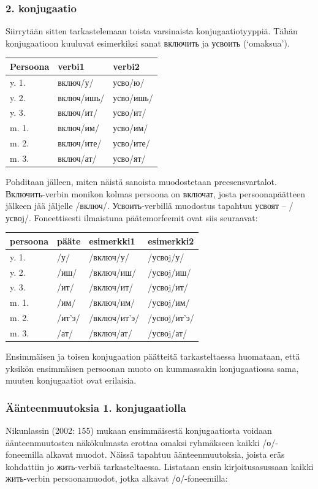 \documentclass[]{scrartcl}
\begin{document}
\subsubsection{2. konjugaatio}\label{konjugaatio-1}

Siirrytään sitten tarkastelemaan toista varsinaista konjugaatiotyyppiä.
Tähän konjugaatioon kuuluvat esimerkiksi sanat включить ja усвоить
(`omaksua').

\begin{longtable}[c]{@{}lll@{}}
\toprule
Persoona & verbi1 & verbi2\tabularnewline
\midrule
\endhead
y. 1. & включ/у/ & усво/ю/\tabularnewline
y. 2. & включ/ишь/ & усво/ишь/\tabularnewline
y. 3. & включ/ит/ & усво/ит/\tabularnewline
m. 1. & включ/им/ & усво/им/\tabularnewline
m. 2. & включ/ите/ & усво/ите/\tabularnewline
m. 3. & включ/ат/ & усво/ят/\tabularnewline
\bottomrule
\end{longtable}

Pohditaan jälleen, miten näistä sanoista muodostetaan preesensvartalot.
Включить-verbin monikon kolmas persoona on включат, josta
persoonapäätteen jälkeen jää jäljelle /включ/. Усвоить-verbillä
muodostus tapahtuu усвоят -- /усвоj/. Foneettisesti ilmaistuna
päätemorfeemit ovat siis seuraavat:

\begin{longtable}[c]{@{}llll@{}}
\toprule
persoona & pääte & esimerkki1 & esimerkki2\tabularnewline
\midrule
\endhead
y. 1. & /у/ & /включ/у/ & /усвоj/у/\tabularnewline
y. 2. & /иш/ & /включ/иш/ & /усвоj/иш/\tabularnewline
y. 3. & /ит/ & /включ/ит/ & /усвоj/ит/\tabularnewline
m. 1. & /им/ & /включ/им/ & /усвоj/им/\tabularnewline
m. 2. & /ит'э/ & /включ/ит'э/ & /усвоj/ит'э/\tabularnewline
m. 3. & /ат/ & /включ/ат/ & /усвоj/ат/\tabularnewline
\bottomrule
\end{longtable}

Ensimmäisen ja toisen konjugaation päätteitä tarkasteltaessa huomataan,
että yksikön ensimmäisen persoonan muoto on kummassakin konjugaatiossa
sama, muuten konjugaatiot ovat erilaisia.

\subsubsection{Äänteenmuutoksia 1.
konjugaatiolla}\label{uxe4uxe4nteenmuutoksia-1.-konjugaatiolla}

Nikunlassin (2002: 155) mukaan ensimmäisestä konjugaatiosta voidaan
äänteenmuutosten näkökulmasta erottaa omaksi ryhmäkseen kaikki
/о/-foneemilla alkavat muodot. Näissä tapahtuu äänteenmuutoksia, joista
eräs kohdattiin jo жить-verbiä tarkasteltaessa. Listataan ensin
kirjoitusasussaan kaikki жить-verbin persoonamuodot, jotka alkavat
/о/-foneemilla:
\end{document}
